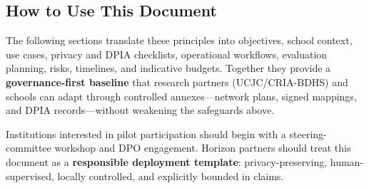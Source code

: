 \subsection{How to Use This Document}

The following sections translate these principles into objectives, school context, use cases,
privacy and DPIA checklists, operational workflows, evaluation planning, risks, timelines,
and indicative budgets.
Together they provide a \textbf{governance-first baseline} that research partners (UCJC/CRIA-BDHS)
and schools can adapt through controlled annexes---network plans, signed mappings, and
DPIA records---without weakening the safeguards above.

Institutions interested in pilot participation should begin with a steering-committee
workshop and DPO engagement.
Horizon partners should treat this document as a \textbf{responsible deployment template}:
privacy-preserving, human-supervised, locally controlled, and explicitly bounded in claims.
